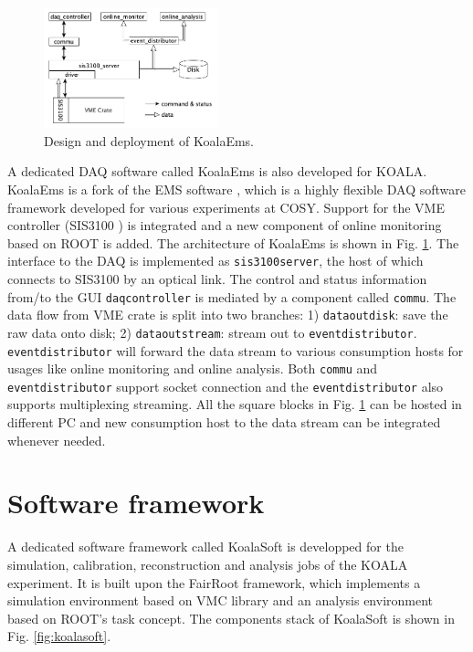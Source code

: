 \documentclass[number,5p]{elsarticle}
\begin{document}
\begin{figure}[htbp]
\centering
\includegraphics[width=0.45\textwidth]{./koalaems_deployment.png}
\caption{Design and deployment of KoalaEms.}
\label{fig:koalaems}
\end{figure}

A dedicated DAQ software called KoalaEms is also developed for KOALA.
KoalaEms is a fork of the EMS software \cite{ems}, which is a highly flexible DAQ software framework developed for various experiments at COSY.
Support for the VME controller (SIS3100 \cite{sis}) is integrated and a new component of online monitoring based on ROOT is added.
The architecture of KoalaEms is shown in Fig. \ref{fig:koalaems}.
The interface to the DAQ is implemented as \linebreak\texttt{sis3100\textunderscore server}, the host of which
connects to SIS3100 by an optical link.
The control and status information from/to the GUI \texttt{daq\textunderscore controller} is mediated by a component called \texttt{commu}.
The data flow from VME crate is split into two branches: 1) \texttt{data\textunderscore out\textunderscore disk}: save the raw data onto disk; 2) \texttt{data\textunderscore out\textunderscore stream}: stream out to \texttt{event\textunderscore distributor}.
\texttt{event\textunderscore distributor} will forward the data stream to various consumption hosts for usages like online monitoring and online analysis.
Both \texttt{commu} and \texttt{event\textunderscore distributor} support socket connection and the \texttt{event\textunderscore distributor} also supports multiplexing streaming.
All the square blocks in Fig. \ref{fig:koalaems} can be hosted in different PC and new consumption host to the data stream can be integrated whenever needed.

\section{Software framework}
\label{sec:software}

A dedicated software framework called KoalaSoft is developped for the simulation, calibration, reconstruction and analysis jobs of the KOALA experiment.
It is built upon the FairRoot \cite{fairroot} framework, which implements a simulation environment based on VMC \cite{vmc} library and an analysis environment based on ROOT's task concept.
The components stack of KoalaSoft is shown in Fig. \ref{fig:koalasoft}.
\end{document}
